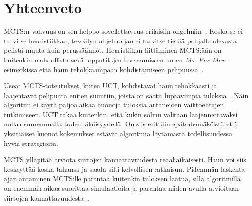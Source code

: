 \documentclass[12pt,finnish]{tktltiki2}
\theoremstyle{definition}
\theoremstyle{remark}
\begin{document}
\section{Yhteenveto}

MCTS:n vahvuus on sen helppo sovellettavuus erilaisiin ongelmiin~\cite{browne}. Koska se ei tarvitse heuristiikkaa, tekoälyn ohjelmoijan ei tarvitse tietää pohjalla olevasta pelistä muuta kuin perussäännöt. Heuristiikan liittäminen MCTS:ään on kuitenkin mahdollista sekä lopputilojen korvaamiseen kuten \textit{Ms. Pac-Man} -esimerkissä että haun tehokkaampaan kohdistamiseen pelipuussa~\cite{browne}.

Useat MCTS-toteutukset, kuten UCT, kohdistavat haun tehokkaasti ja laajentavat pelipuuta eniten suuntiin, joista on saatu lupaavimpia tuloksia~\cite{browne}. Näin algoritmi ei käytä paljoa aikaa huonoja tuloksia antaneiden vaihtoehtojen tutkimiseen. UCT takaa kuitenkin, että kukin solmu valitaan laajennettavaksi nollaa suuremmalla todennäköisyydellä. On siis erittäin epätodennäköistä että yksittäiset huonot kokemukset estävät algoritmia löytämästä todellisuudessa hyviä strategioita.

MCTS ylläpitää arviota siirtojen kannattavuudesta reaaliaikaisesti. Haun voi siis keskeyttää koska tahansa ja saada silti kelvollisen ratkaisun. Pidemmän laskenta-ajan antaminen MCTS:lle parantaa kuitenkin tuloksen laatua, sillä algoritmilla on enemmän aikaa suorittaa simulaatioita ja parantaa niiden avulla arvioitaan siirtojen kannattavuudesta~\cite{browne}.


%
%
% 
%







% 
\end{document}
